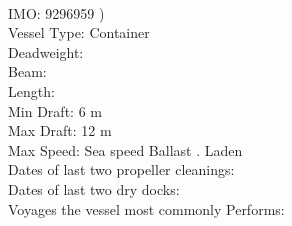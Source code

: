 \documentclass[a4paper,12pt,dvipsnames]{scrartcl}
\begin{document}
\begin{titlepage}
                            \noindent\normalsize{} \hfill \normalsize{} \\
                            \normalsize{IMO: 9296959 )} \\
                            \normalsize{Vessel Type: Container} \\
                            \normalsize{Deadweight: } \\
                            \normalsize{Beam: } \\
                            \normalsize{Length:  }\\
                            \normalsize{Min Draft: 6 m} \\
                            \normalsize{Max Draft: 12 m} \\
                            \normalsize{Max Speed: Sea speed Ballast . Laden } \\
                            \normalsize{
                            Dates of last two propeller cleanings:	 }\\
                            \normalsize{Dates of last two dry docks:  }\\
                            \normalsize{Voyages the vessel most commonly
                            Performs: }



                            \end{titlepage}

                            \restoregeometry %
                           
            
            \newpage %
            \tableofcontents %
            
            \newpage %
            \renewcommand\listfigurename{List Of Figures}
            \listoffigures
            
            
            
            \newpage %
            \setcounter{page}{1} %
            
\end{document}
